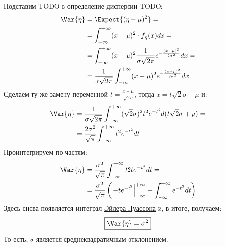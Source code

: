 Подставим TODO в определение дисперсии TODO: \[\begin{aligned}
    \Var{\eta} &= \Expect{(\eta - \mu)^2} =\\
               &= \int_{-\infty}^{+\infty} (x-\mu)^2 \cdot f_{\eta}(x)dx =\\
               &= \int_{-\infty}^{+\infty}(x-\mu)^2 \frac{1}{\sigma\sqrt{2\pi}}e^{-\frac{(x-\mu)^2}{2\sigma^2}}dx =\\
               &= \frac{1}{\sigma\sqrt{2\pi}}\int_{-\infty}^{+\infty}(x-\mu)^2 e^{-\frac{(x-\mu)^2}{2\sigma^2}}dx
\end{aligned}\] Сделаем ту же замену переменной
\(t = \frac{x-\mu}{\sqrt{2}\sigma}\), тогда \(x = t\sqrt{2}\sigma+\mu\)
и: \[\begin{aligned}
    \Var{\eta} &= \frac{1}{\sigma\sqrt{2\pi}}
                \int_{-\infty}^{+\infty}(\sqrt{2}\sigma)^2 t^2 e^{-t^2}d(t\sqrt{2}\sigma+\mu) =\\
               &= \frac{2\sigma^2}{\sqrt{\pi}}\int_{-\infty}^{+\infty}t^2 e^{-t^2}dt
\end{aligned}\] Проинтегрируем по частям: \[\begin{aligned}
    \Var{\eta} &= \frac{\sigma^2}{\sqrt{\pi}}\int_{-\infty}^{+\infty}t 2t e^{-t^2} dt =\\
               &= \frac{\sigma^2}{\sqrt{\pi}}\left(\left. -t e^{-t^2} \right|_{-\infty}^{+\infty}
                 + \int_{-\infty}^{+\infty}e^{-t^2}dt\right)
\end{aligned}\] Здесь снова появляется интеграл
\href{https://ru.wikipedia.org/wiki/Гауссов_интеграл}{Эйлера-Пуассона}
и, в итоге, получаем: \[\boxed{
    \Var{\eta} = \sigma^2
}\] То есть, \(\sigma\) является среднеквадратичным отклонением.
